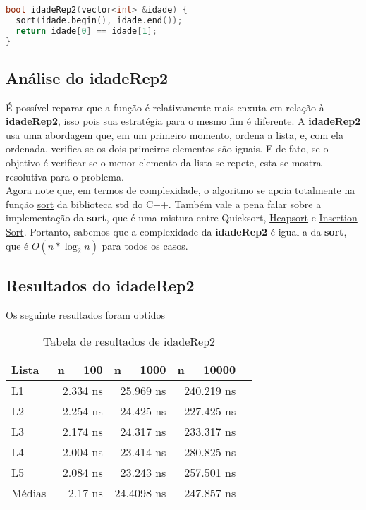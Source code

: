 \begin{lstlisting}[language=C++]
bool idadeRep2(vector<int> &idade) {
  sort(idade.begin(), idade.end());
  return idade[0] == idade[1];
}
\end{lstlisting}
\FloatBarrier

\subsection{Análise do idadeRep2}

É possível reparar que a função é relativamente mais enxuta em relação à \textbf{idadeRep2}, isso pois sua estratégia para o mesmo fim é diferente. A \textbf{idadeRep2} usa uma abordagem que, em um primeiro momento, ordena a lista, e, com ela ordenada, verifica se os dois primeiros elementos são iguais. E de fato, se o objetivo é verificar se o menor elemento da lista se repete, esta se mostra resolutiva para o problema. \\
Agora note que, em termos de complexidade, o algoritmo se apoia totalmente na função \href{https://en.cppreference.com/w/cpp/algorithm/sort}{sort} da biblioteca std do C++. Também vale a pena falar sobre a implementação da \textbf{sort}, que é uma mistura entre Quicksort, \href{https://en.wikipedia.org/wiki/Heapsort}{Heapsort} e \href{https://en.wikipedia.org/wiki/Insertion_sort}{Insertion Sort}. Portanto, sabemos que a complexidade da \textbf{idadeRep2} é igual a da \textbf{sort}, que é $O(n*\log_2{n})$ para todos os casos.

\subsection{Resultados do idadeRep2}

Os seguinte resultados foram obtidos

\begin{table}[h!]
	\centering
	\caption{Tabela de resultados de idadeRep2}
	\label{tab:idade_rep2_result}
	\begin{tabular}{lrrrr}
		\toprule
		Lista   & n = 100   & n = 1000  & n = 10000 \\
		\midrule
		L1      & 2.334 ns    & 25.969 ns    & 240.219 ns  \\
		L2      & 2.254 ns    & 24.425 ns    & 227.425 ns  \\
		L3      & 2.174 ns    & 24.317 ns    & 233.317 ns  \\
		L4      & 2.004 ns    & 23.414 ns    & 280.825 ns  \\
		L5      & 2.084 ns    & 23.243 ns    & 257.501 ns  \\
		\midrule
		Médias  & 2.17 ns  & 24.4098 ns  &  247.857 ns \\
		\bottomrule
	\end{tabular}
\end{table}
\FloatBarrier

